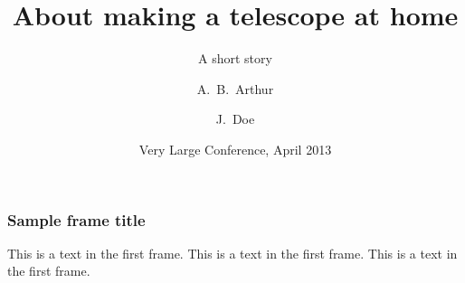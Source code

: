 \documentclass{beamer}
\title[Amateur Telescope Making]
{About making a telescope at home}
\subtitle{A short story}
\author[Arthur, Doe] %
{A.~B.~Arthur\inst{1} \and J.~Doe\inst{2}}
\institute[VFU] %
{
  \inst{1}%
  Faculty of Physics\\
  Very Famous University
  \and
  \inst{2}%
  Faculty of Chemistry\\
  Very Famous University
}
\date[VLC 2013] %
{Very Large Conference, April 2013}
\begin{document}
\frame{\titlepage}

\begin{frame}
\frametitle{Sample frame title}
This is a text in the first frame. This is a text in the first frame. This is a text in the first frame.
\end{frame}
\end{document}
